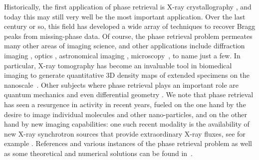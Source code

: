 \documentclass[11pt]{article}
\newcommand{\<}{\langle}
\renewcommand{\>}{\rangle}
\numberwithin{equation}{section}
\begin{document}
Historically, the first application of phase retrieval is X-ray
crystallography \cite{Mil90,Har93}, and today this may still very well
be the most important application.  Over the last century or so, this
field has developed a wide array of techniques to recover Bragg peaks
from missing-phase data.  Of course, the phase retrieval problem
permeates many other areas of imaging science, and other applications
include diffraction imaging \cite{Bun07}, optics \cite{Wal63},
astronomical imaging \cite{DF87}, microscopy~\cite{MIS08}, to name
just a few.  In particular, X-ray tomography has become an invaluable
tool in biomedical imaging to generate quantitative 3D density maps of
extended specimens on the nanoscale~\cite{Die10}.  Other subjects
where phase retrieval plays an important role are quantum mechanics
\cite{Rei44,Cor06} and even differential geometry \cite{BSV02}.  We
note that phase retrieval has seen a resurgence in activity in recent
years, fueled on the one hand by the desire to image individual
molecules and other nano-particles, and on the other hand by new
imaging capabilities: one such recent modality is the availability of
new X-ray synchrotron sources that provide extraordinary X-ray fluxes,
see for example \cite{Mil06,Sca06,Bog08,MIS08,Die10}.  References and
various instances of the phase retrieval problem as well as some
theoretical and numerical solutions can be found
in~\cite{Hur89,LBL02,KST95}.
\end{document}
